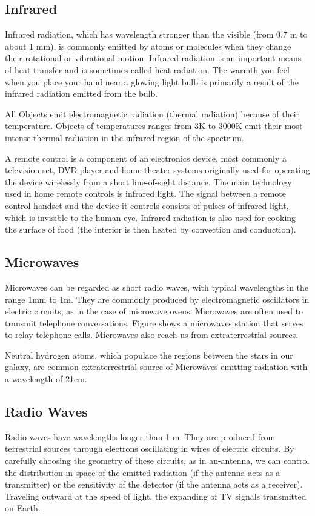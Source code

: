 \subsection{Infrared}
Infrared radiation, which has wavelength stronger than the visible
(from 0.7 m to about 1 mm), is commonly emitted by atoms or molecules
when they change their rotational or vibrational motion.
Infrared radiation is an important means of heat transfer and is
sometimes called heat radiation. The warmth you feel when you place
your hand near a glowing light bulb is primarily a result of the infrared
radiation emitted from the bulb.

All Objects emit electromagnetic radiation (thermal radiation) because
of their temperature. Objects of temperatures ranges from  3K to 3000K
emit their most intense thermal radiation in the infrared region of the
spectrum.
          
A remote control is a component of an electronics device, most commonly a
television set, DVD player and home theater systems originally used for
operating the device wirelessly from a short line-of-sight distance.
The main technology used in home remote controls is infrared light.
The signal between a remote control handset and the device it controls
consists of pulses of infrared light, which is invisible to the human eye.
Infrared radiation is also used for cooking the surface of food
(the interior is then heated by convection and conduction).
\subsection{Microwaves}
Microwaves can be regarded as short radio waves, with typical wavelengths
in the range 1mm to 1m. They are commonly produced by electromagnetic
oscillators in electric circuits, as in the case of microwave ovens.
Microwaves are often used to transmit telephone conversations.
Figure shows a microwaves station that serves to relay telephone calls.
Microwaves also reach us from extraterrestrial sources.

Neutral hydrogen atoms, which populace the regions between the stars in
our galaxy, are common extraterrestrial source of Microwaves emitting
radiation with a wavelength of 21cm.
\subsection{Radio Waves}
Radio waves have wavelengths longer than 1 m. They are  produced from
terrestrial sources through electrons oscillating in wires of electric
circuits. By carefully choosing the geometry of these circuits, as in
an-antenna, we can control the distribution in space of the emitted
radiation (if the antenna acts as a transmitter) or the sensitivity
of the detector (if the antenna acts as a receiver). Traveling outward
at the speed of light, the expanding of TV signals transmitted on Earth. 

